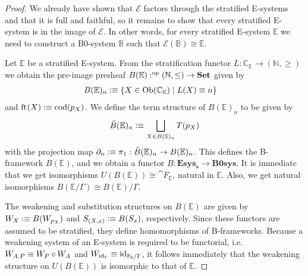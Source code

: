 \begin{proof}
We already have shown that $\mathcal{E}$ factors through the stratified
E-systems and that it is full and faithful, so it remains
to show that every stratified E-system is in the image of $\mathcal{E}$. In
other words, for every stratified E-system $\mathbb{E}$ we need to construct
a B0-system $\mathbb{B}$ such that $\mathcal{E}(\mathbb{B})\cong\mathbb{E}$. 

Let $\mathbb{E}$ be a stratified E-system. From the stratification functor
$L:\mathbb{C}_{\mathbb{E}}\to (\mathbb{N},\geq)$ we obtain the pre-image
presheaf $B(\mathbb{E}):\op{(\mathbb{N},\leq)}\to\mathbf{Set}$ given by
\begin{align*}
B(\mathbb{E})_n & \defeq \{X\in\mathrm{Ob}(\mathbb{C}_{\mathbb{E}})\mid L(X)\jdeq n\}
\end{align*}
and $\eft(X)\defeq\mathrm{cod}(p_X)$. We define the term structure of $B(\mathbb{E})_n$
to be given by
\begin{equation*}
\tilde{B}(\mathbb{E})_n \defeq \bigsqcup_{X\in B(\mathbb{E})_n} T(p_X)
\end{equation*}
with the projection map $\ebd[n]\defeq\pi_1:\tilde{B}(\mathbb{E})_n\to B(\mathbb{E})_n$.
This defines the B-framework $B(\mathbb{E})$, and we obtain a functor
$B:\mathbf{Esys_s}\to\mathbf{B0sys}$. It is immediate that we get isomorphisms
$U(B(\mathbb{E}))\cong\cat{F}_{\mathbb{E}}$, natural in $\mathbb{E}$. Also, we
get natural isomorphisms $B(\mathbb{E}/\Gamma)\cong B(\mathbb{E})/\Gamma$. 

The weakening and substitution structures on
$B(\mathbb{E})$ are given by $W_X\defeq B(W_{p_X})$ and $S_{(X,x)}\defeq B(S_x)$,
respectively. Since these functors are assumed to be stratified, they define
homomorphisms of B-frameworks. Because a weakening system of an E-system is
required to be functorial, i.e.~$W_{\ctxext{A}{P}}\jdeq W_P\circ W_A$ and
$W_{\catid{\Gamma}}\jdeq\catid{\cat{F}_{\mathbb{E}}/\Gamma}$, it follows
immediately that the weakening structure on $U(B(\mathbb{E}))$ is isomorphic to
that of $\mathbb{E}$. 
\end{proof}

